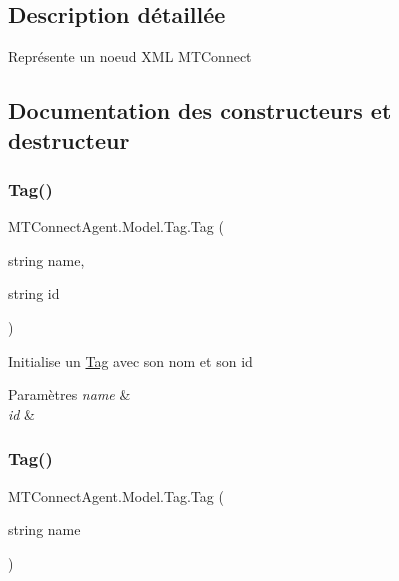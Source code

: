 \subsection{Description détaillée}
Représente un noeud X\+ML M\+T\+Connect 



\subsection{Documentation des constructeurs et destructeur}
\mbox{\label{class_m_t_connect_agent_1_1_model_1_1_tag_a7a97e2920ac3143e7e54ff26e5e43d0a}} 
\subsubsection{\texorpdfstring{Tag()}{Tag()}\hspace{0.1cm}{\footnotesize\ttfamily [1/3]}}
{\footnotesize\ttfamily M\+T\+Connect\+Agent.\+Model.\+Tag.\+Tag (\begin{DoxyParamCaption}\item[{string}]{name,  }\item[{string}]{id }\end{DoxyParamCaption})\hspace{0.3cm}{\ttfamily [inline]}}



Initialise un \mbox{\hyperlink{class_m_t_connect_agent_1_1_model_1_1_tag}{Tag}} avec son nom et son id 


\begin{DoxyParams}{Paramètres}
{\em name} & \\
\hline
{\em id} & \\
\hline
\end{DoxyParams}
\mbox{\label{class_m_t_connect_agent_1_1_model_1_1_tag_a52a0e7d9a403166030deed02bd876697}} 
\subsubsection{\texorpdfstring{Tag()}{Tag()}\hspace{0.1cm}{\footnotesize\ttfamily [2/3]}}
{\footnotesize\ttfamily M\+T\+Connect\+Agent.\+Model.\+Tag.\+Tag (\begin{DoxyParamCaption}\item[{string}]{name }\end{DoxyParamCaption})\hspace{0.3cm}{\ttfamily [inline]}}



